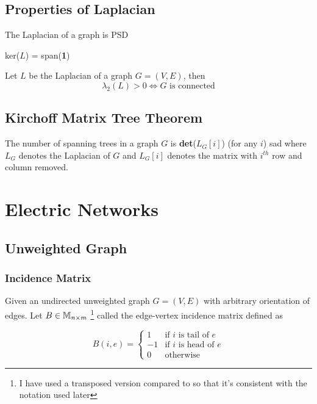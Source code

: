 \subsection{Properties of Laplacian}

\begin{Bf}
 The Laplacian of a graph is PSD
\end{Bf}

\begin{Bf}
 ker($L$) = span(\textbf{1})
\end{Bf}

\begin{Bf}
 Let $L$ be the Laplacian of a graph $G= (V,E)$, then
 $$ \lambda_2(L) > 0 \iff G \text{ is connected}$$
\end{Bf}


\subsection{Kirchoff Matrix Tree Theorem}

\begin{Bf}
 The number of spanning trees in a graph $G$ is \textbf{det}($L_G[i]$) (for any $i$) sad where $L_G$ denotes the Laplacian of $G$ and $L_G[i]$ denotes the matrix with $i^{th}$ row and column removed. 
\end{Bf}


\section{Electric Networks}

\subsection{Unweighted Graph}

\subsubsection{Incidence Matrix} 

Given an undirected unweighted graph $G=(V,E)$ with arbitrary orientation of edges. Let $B \in  \mathbb{M}_{n \times m}$ \footnote{I have used a transposed version compared to \citet{TCS-054} so that it's consistent with the notation used later} called the edge-vertex incidence matrix defined as 

\[
    B(i, e) = 
\begin{cases}
 1 & \text{if } i \text{ is tail of } e\\
 -1 & \text{if } i \text{ is head of } e \\
 0 & \text{otherwise}
\end{cases}
\]

